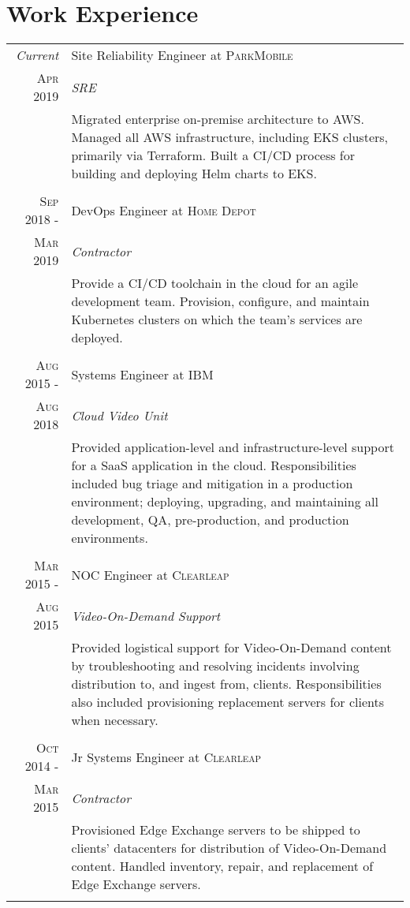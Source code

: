 \documentclass[a4paper,9pt]{extarticle}
\begin{document}
\section{Work Experience}
\begin{tabular}{r|p{8.5cm}}
 \emph{Current}&Site Reliability Engineer at \textsc{ParkMobile}\\\textsc{Apr 2019}&\emph{SRE}\\&\footnotesize{Migrated enterprise on-premise architecture to AWS. Managed all AWS infrastructure, including EKS clusters, primarily via Terraform. Built a CI/CD process for building and deploying Helm charts to EKS.}\\\multicolumn{2}{c}{}\\
 \textsc{Sep 2018 -}&DevOps Engineer at \textsc{Home Depot}\\\textsc{Mar 2019}&\emph{Contractor}\\&\footnotesize{Provide a CI/CD toolchain in the cloud for an agile development team. Provision, configure, and maintain Kubernetes clusters on which the team's services are deployed.}\\\multicolumn{2}{c}{}\\
 \textsc{Aug 2015 -}&Systems Engineer at \textsc{IBM}\\\textsc{Aug 2018}&\emph{Cloud Video Unit}\\&\footnotesize{Provided application-level and infrastructure-level support for a SaaS application in the cloud. Responsibilities included bug triage and mitigation in a production environment; deploying, upgrading, and maintaining all development, QA, pre-production, and production environments.}\\\multicolumn{2}{c}{}\\
 \textsc{Mar 2015 -}&NOC Engineer at \textsc{Clearleap}\\\textsc{Aug 2015}&\emph{Video-On-Demand Support}\\&\footnotesize{Provided logistical support for Video-On-Demand content by troubleshooting and resolving incidents involving distribution to, and ingest from, clients. Responsibilities also included provisioning replacement servers for clients when necessary.}\\\multicolumn{2}{c}{}\\
 \textsc{Oct 2014 -}&Jr Systems Engineer at \textsc{Clearleap}\\\textsc{Mar 2015}&\emph{Contractor}\\&\footnotesize{Provisioned Edge Exchange servers to be shipped to clients' datacenters for distribution of Video-On-Demand content. Handled inventory, repair, and replacement of Edge Exchange servers.}\\\multicolumn{2}{c}{}\\
\end{tabular}
\end{document}
